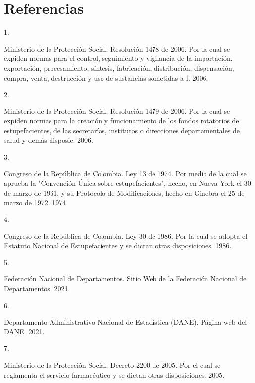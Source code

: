 \documentclass[
]{book}
\newlength{\cslhangindent}
\newlength{\csllabelwidth}
\newlength{\cslentryspacingunit} %
\newenvironment{CSLReferences}[2] %
 {%
  \setlength{\parindent}{0pt}
  \ifodd #1
  \let\oldpar\par
  \def\par{\hangindent=\cslhangindent\oldpar}
  \fi
  \setlength{\parskip}{#2\cslentryspacingunit}
 }%
 {}
\newcommand{\CSLLeftMargin}[1]{\parbox[t]{\csllabelwidth}{#1}}
\newcommand{\CSLRightInline}[1]{\parbox[t]{\linewidth - \csllabelwidth}{#1}\break}
\begin{document}
\hypertarget{referencias}{%
\chapter*{Referencias}\label{referencias}}

\hypertarget{refs}{}
\begin{CSLReferences}{0}{0}
\leavevmode{}%
\CSLLeftMargin{1. }
\CSLRightInline{Ministerio de la Protección Social. {Resoluci{ó}n 1478 de 2006. Por la cual se expiden normas para el control, seguimiento y vigilancia de la importaci{ó}n, exportaci{ó}n, procesamiento, s{í}ntesis, fabricaci{ó}n, distribuci{ó}n, dispensaci{ó}n, compra, venta, destrucci{ó}n y uso de sustancias sometidas a f}. 2006.}

\leavevmode{}%
\CSLLeftMargin{2. }
\CSLRightInline{Ministerio de la Protección Social. {Resoluci{ó}n 1479 de 2006. Por la cual se expiden normas para la creaci{ó}n y funcionamiento de los fondos rotatorios de estupefacientes, de las secretar{í}as, institutos o direcciones departamentales de salud y dem{á}s disposic}. 2006.}

\leavevmode{}%
\CSLLeftMargin{3. }
\CSLRightInline{Congreso de la República de Colombia. {Ley 13 de 1974. Por medio de la cual se aprueba la "Convenci{ó}n {Ú}nica sobre estupefacientes", hecho, en Nueva York el 30 de marzo de 1961, y su Protocolo de Modificaciones, hecho en Ginebra el 25 de marzo de 1972}. 1974.}

\leavevmode{}%
\CSLLeftMargin{4. }
\CSLRightInline{Congreso de la República de Colombia. {Ley 30 de 1986. Por la cual se adopta el Estatuto Nacional de Estupefacientes y se dictan otras disposiciones.} 1986.}

\leavevmode{}%
\CSLLeftMargin{5. }
\CSLRightInline{Federación Nacional de Departamentos. {Sitio Web de la Federaci{ó}n Nacional de Departamentos}. 2021.}

\leavevmode{}%
\CSLLeftMargin{6. }
\CSLRightInline{Departamento Administrativo Nacional de Estadística (DANE). {P{á}gina web del DANE}. 2021.}

\leavevmode{}%
\CSLLeftMargin{7. }
\CSLRightInline{Ministerio de la Protección Social. {Decreto 2200 de 2005. Por el cual se reglamenta el servicio farmac{é}utico y se dictan otras disposiciones.} 2005.}


\end{CSLReferences}
\end{document}
